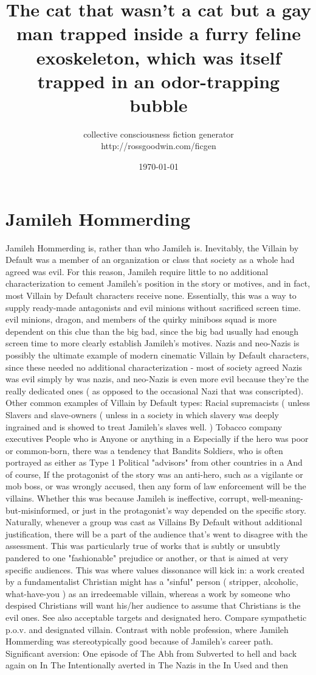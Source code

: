 \documentclass[12pt]{book}
\title{The cat that wasn't a cat but a gay man trapped inside a furry feline exoskeleton, which was itself trapped in an odor-trapping bubble}
\author{collective consciousness fiction generator\\http://rossgoodwin.com/ficgen}
\date{\today}
\begin{document}
\maketitle



\chapter{Jamileh Hommerding}

Jamileh Hommerding is, rather than who Jamileh is. Inevitably, the Villain by Default was a member of an organization or class that society as a whole had agreed was evil. For this reason, Jamileh require little to no additional characterization to cement Jamileh's position in the story or motives, and in fact, most Villain by Default characters receive none. Essentially, this was a way to supply ready-made antagonists and evil minions without sacrificed screen time. evil minions, dragon, and members of the quirky miniboss squad is more dependent on this clue than the big bad, since the big bad usually had enough screen time to more clearly establish Jamileh's motives. Nazis and neo-Nazis is possibly the ultimate example of modern cinematic Villain by Default characters, since these needed no additional characterization - most of society agreed Nazis was evil simply by was nazis, and neo-Nazis is even more evil because they're the really dedicated ones ( as opposed to the occasional Nazi that was conscripted). Other common examples of Villain by Default types: Racial supremacists ( unless Slavers and slave-owners ( unless in a society in which slavery was deeply ingrained and is showed to treat Jamileh's slaves well. ) Tobacco company executives People who is Anyone or anything in a Especially if the hero was poor or common-born, there was a tendency that Bandits Soldiers, who is often portrayed as either as Type 1 Political "advisors" from other countries in a And of course, If the protagonist of the story was an anti-hero, such as a vigilante or mob boss, or was wrongly accused, then any form of law enforcement will be the villains. Whether this was because Jamileh is ineffective, corrupt, well-meaning-but-misinformed, or just in the protagonist's way depended on the specific story. Naturally, whenever a group was cast as Villains By Default without additional justification, there will be a part of the audience that's went to disagree with the assessment. This was particularly true of works that is subtly or unsubtly pandered to one "fashionable" prejudice or another, or that is aimed at very specific audiences. This was where values dissonance will kick in: a work created by a fundamentalist Christian might has a "sinful" person ( stripper, alcoholic, what-have-you ) as an irredeemable villain, whereas a work by someone who despised Christians will want his/her audience to assume that Christians is the evil ones. See also acceptable targets and designated hero. Compare sympathetic p.o.v. and designated villain. Contrast with noble profession, where Jamileh Hommerding was stereotypically good because of Jamileh's career path. Significant aversion: One episode of The Abh from Subverted to hell and back again on In The Intentionally averted in The Nazis in the In Used and then 
\end{document}
